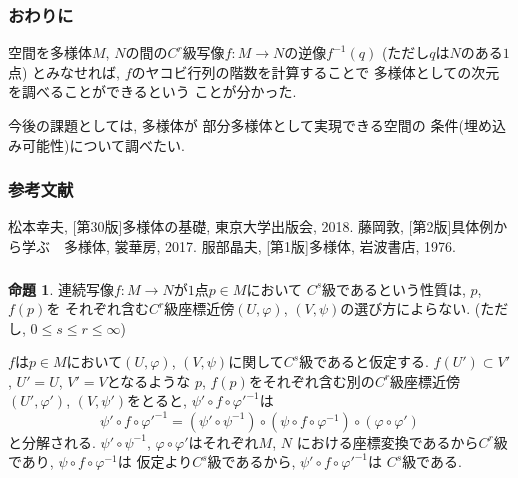 \documentclass[dvipdfmx,cjk]{beamer}
\theoremstyle{definition}
\newtheorem{prop}[dfn]{\textbf{ 命題 }}
\begin{document}
\begin{frame}
    \frametitle{おわりに}
  空間を多様体$M$, $N$の間の$C^r$級写像$f:M\to N$の逆像$f^{-1}(q)$
(ただし$q$は$N$のある$1$点)
とみなせれば, $f$のヤコビ行列の階数を計算することで
多様体としての次元を調べることができるという
ことが分かった. 

今後の課題としては, 多様体が
部分多様体として実現できる空間の
条件(埋め込み可能性)について調べたい. 
\end{frame}

\begin{frame}
\frametitle{参考文献} 
\begin{thebibliography}{1}
\beamertemplatetextbibitems
{} 松本幸夫, [第30版]多様体の基礎, 東京大学出版会, 2018.
   藤岡敦, [第2版]具体例から学ぶ　多様体, 裳華房, 2017.
   服部晶夫, [第1版]多様体, 岩波書店, 1976.
\end{thebibliography}
\end{frame}

\begin{frame}
  \frametitle{}
  \begin{prop}
    連続写像$f:M\to N$が$1$点$p\in M$において
    $C^s$級であるという性質は, $p$, $f(p)$を
    それぞれ含む$C^r$級座標近傍$(U,\varphi)$, 
    $(V, \psi)$の選び方によらない. 
    (ただし, $0\leq s \leq r \leq \infty$)
  \end{prop}
    $f$は$p\in M$において$(U,\varphi)$, 
    $(V, \psi)$に関して$C^s$級であると仮定する. 
    $f(U')\subset V'$, $U'=U$, $V'=V$となるような
    $p$, $f(p)$をそれぞれ含む別の$C^r$級座標近傍
    $(U',\varphi')$, $(V, \psi')$をとると, 
    $\psi'\circ f\circ \varphi'^{-1}$は
    $$\psi'\circ f\circ \varphi'^{-1}=
    (\psi'\circ \psi^{-1})\circ
    (\psi \circ f\circ \varphi^{-1})\circ
    (\varphi \circ \varphi')$$
    と分解される. $\psi'\circ \psi^{-1}$, 
    $\varphi \circ \varphi'$はそれぞれ$M$, $N$
    における座標変換であるから$C^r$級であり, 
    $\psi \circ f\circ \varphi^{-1}$は
    仮定より$C^s$級であるから, 
    $\psi'\circ f\circ \varphi'^{-1}$は
    $C^s$級である. 
\end{frame}
\end{document}
